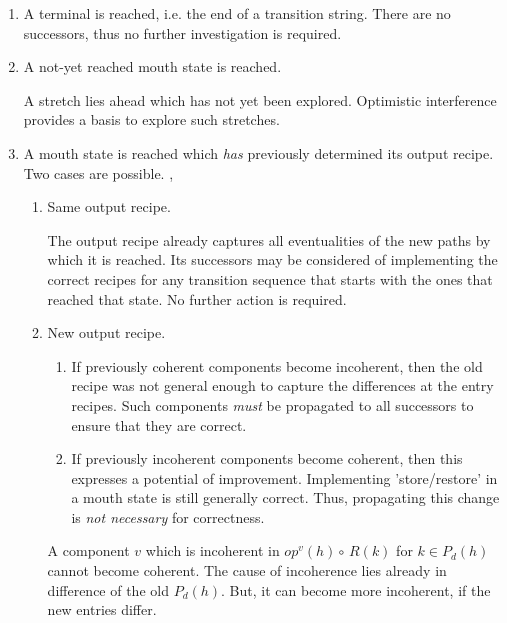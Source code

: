 \documentclass[12pt,a4paper]{scrartcl}
\begin{document}
\begin{enumerate}
    \item A terminal is reached, i.e. the end of a transition string. There are 
        no successors, thus no further investigation is required. 

    \item A not-yet reached mouth state is reached. \label{itm:not-yet-reached-mouth}

        A stretch lies ahead which has not yet been explored.  Optimistic
        interference provides a basis to explore such stretches.

    \item A mouth state is reached which \textit{has} previously determined its
        output recipe. Two cases are possible.
,
        \begin{enumerate}
            \item Same output recipe.

                The output recipe already captures all eventualities of the new
                paths by which it is reached. Its successors may be considered
                of implementing the correct recipes for any transition sequence
                that starts with the ones that reached that state. No further
                action is required.

            \item New output recipe.

                \begin{enumerate}
                \item If previously coherent components become incoherent, then the
                old recipe was not general enough to capture the differences at
                the entry recipes.  Such components \textit{must} be propagated to all
                successors to ensure that they are correct. \label{itm:new-recipe-coherent-to-incoherent}
                    
                \item If previously incoherent components become coherent, then this
                expresses a potential of improvement. Implementing 'store/restore' 
                in a mouth state is still generally correct. Thus, propagating this 
                change is \textit{not necessary} for correctness.
                \label{itm:new-recipe-incoherent-to-coherent}
                \end{enumerate}
          
                A component $v$ which is incoherent in $op^v(h)\circ\,R(k)$ for
                $k\in P_d(h)$ cannot become coherent. The cause of incoherence
                lies already in difference of the old $P_d(h)$.  But, it can
                become more incoherent, if the new entries differ. 

        \end{enumerate}
        
\end{enumerate}
\end{document}
